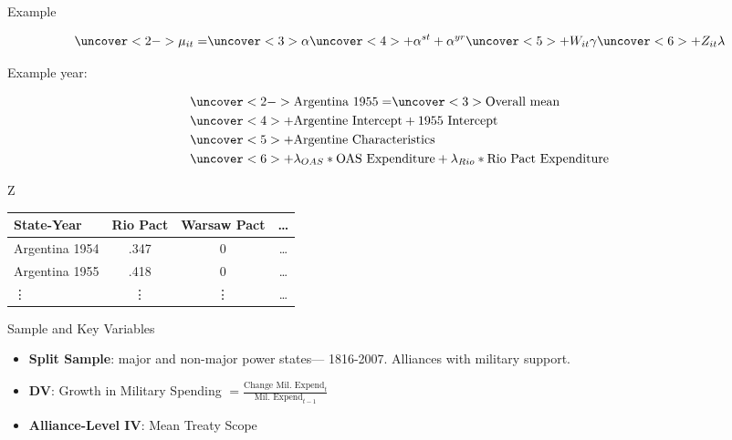 \documentclass{beamer}
\begin{document}

\begin{frame}{Example}


\begin{equation*}
\uncover<2->{\mu_{it} =} \uncover<3>{\alpha} \uncover<4>{+ \alpha^{st} + \alpha^{yr}} \uncover<5>{+ W_{it} \gamma} \uncover<6>{+ Z_{it} \lambda}
\end{equation*}

Example year: 

\begin{equation*}
\begin{split}
& \uncover<2->{\mbox{Argentina 1955} = } \uncover<3>{\mbox{Overall mean}} \\
& \uncover<4>{+ \mbox{Argentine Intercept} + \mbox{1955 Intercept}} \\
& \uncover<5>{+ \mbox{Argentine Characteristics}} \\
& \uncover<6>{+ \lambda_{OAS} * \mbox{OAS Expenditure} + \lambda_{Rio} * \mbox{Rio Pact Expenditure}}
\end{split}
\end{equation*}



\end{frame}




\begin{frame}[standout]{Z} 

\begin{tabular}{lccc}
State-Year & Rio Pact & Warsaw Pact & \ldots \\
\hline
Argentina 1954 & .347 & 0 & \ldots \\
Argentina 1955 & .418  & 0 & \ldots  \\
 \vdots & \vdots & \vdots & \ldots  
\end{tabular}

 \end{frame}




\begin{frame}{Sample and Key Variables}

\begin{itemize}
\item \textbf{Split Sample}: major and non-major power states--- 1816-2007. Alliances with military support. 
\pause
\item \textbf{DV}: Growth in Military Spending $ = \frac{ \mbox{Change Mil. Expend}_t }{ \mbox{Mil. Expend}_{t-1} }$ 
\pause
\item \textbf{Alliance-Level IV}: Mean Treaty Scope
\end{itemize} 

\end{frame}
\end{document}
